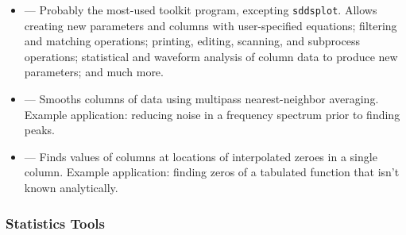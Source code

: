 \documentclass[11pt]{article}
\begin{document}
\begin{itemize}
\item {} --- Probably the most-used toolkit program, excepting \verb|sddsplot|.  Allows
creating new parameters and columns with user-specified equations; filtering and matching operations; printing,
editing, scanning, and subprocess operations; statistical and waveform analysis of column data to produce new
parameters; and much more.

\item {} --- Smooths columns of data using multipass nearest-neighbor averaging.  Example
application: reducing noise in a frequency spectrum prior to finding peaks.

\item {} --- Finds values of columns at locations of interpolated zeroes in a single column.
Example application: finding zeros of a tabulated function that isn't known analytically.

\end{itemize}

\subsubsection{Statistics Tools}
\end{document}
